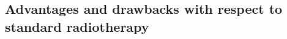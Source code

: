 \subsection{Advantages and drawbacks with respect to standard radiotherapy}\label{chap1::subsec::ProContro}





